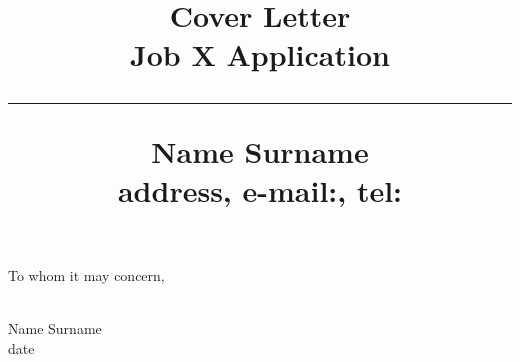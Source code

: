 \documentclass[svgnames,11pt,a4paper]{article}
\title{%
        \vspace{-3\baselineskip}
            \normalsize
   Cover Letter\\
            {\large\textbf{Job X Application}}\\
            \vspace{0.5\baselineskip}
            \hrule
            \vspace{0.5\baselineskip}
            {\large Name Surname}\\
            address,   
            e-mail:,
            tel: 
        \vspace{-1.5ex}
        }
\date{}
\author{}
\begin{document}
%
\maketitle
\thispagestyle{empty}
%
To whom it may concern,\\
\\
\lipsum[1-3]
%
\vspace{1cm}
%
\begin{flushright}
Name Surname\\
date
\end{flushright}
\end{document}
